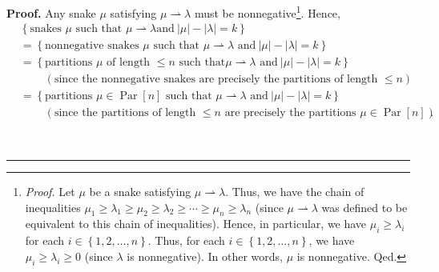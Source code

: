 \documentclass[numbers=enddot,12pt,final,onecolumn,notitlepage]{scrartcl}%
\theoremstyle{definition}
\newenvironment{proof}[1][Proof]{\noindent\textbf{#1.} }{\ \rule{0.5em}{0.5em}}
\newenvironment{verlong}{}{}
\begin{document}
\begin{proof}
\begin{verlong}
Any snake $\mu$ satisfying $\mu\rightharpoonup\lambda$ must be
nonnegative\footnote{\textit{Proof.} Let $\mu$ be a snake satisfying
$\mu\rightharpoonup\lambda$. Thus, we have the chain of inequalities $\mu
_{1}\geq\lambda_{1}\geq\mu_{2}\geq\lambda_{2}\geq\cdots\geq\mu_{n}\geq
\lambda_{n}$ (since $\mu\rightharpoonup\lambda$ was defined to be equivalent
to this chain of inequalities). Hence, in particular, we have $\mu_{i}%
\geq\lambda_{i}$ for each $i\in\left\{  1,2,\ldots,n\right\}  $. Thus, for
each $i\in\left\{  1,2,\ldots,n\right\}  $, we have $\mu_{i}\geq\lambda
_{i}\geq0$ (since $\lambda$ is nonnegative). In other words, $\mu$ is
nonnegative. Qed.}. Hence,%
\begin{align}
&  \left\{  \text{snakes }\mu\text{ such that }\mu\rightharpoonup\lambda\text{
and}\ \left\vert \mu\right\vert -\left\vert \lambda\right\vert =k\right\}
\nonumber\\
&  =\left\{  \text{nonnegative snakes }\mu\text{ such that }\mu\rightharpoonup
\lambda\text{ and}\ \left\vert \mu\right\vert -\left\vert \lambda\right\vert
=k\right\} \nonumber\\
&  =\left\{  \text{partitions }\mu\text{ of length }\leq n\text{ such that
}\mu\rightharpoonup\lambda\text{ and}\ \left\vert \mu\right\vert -\left\vert
\lambda\right\vert =k\right\} \nonumber\\
&  \ \ \ \ \ \ \ \ \ \ \left(  \text{since the nonnegative snakes are
precisely the partitions of length }\leq n\right) \nonumber\\
&  =\left\{  \text{partitions }\mu\in\operatorname*{Par}\left[  n\right]
\text{ such that }\mu\rightharpoonup\lambda\text{ and}\ \left\vert
\mu\right\vert -\left\vert \lambda\right\vert =k\right\}
\label{pf.prop.alt.pieri1.c1.pf.1}\\
&  \ \ \ \ \ \ \ \ \ \ \left(  \text{since the partitions of length }\leq
n\text{ are precisely the partitions }\mu\in\operatorname*{Par}\left[
n\right]  \right)  .\nonumber
\end{align}



\end{verlong}
\end{proof}
\end{document}

